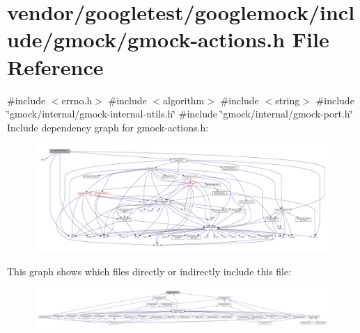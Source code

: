\hypertarget{gmock-actions_8h}{}\section{vendor/googletest/googlemock/include/gmock/gmock-\/actions.h File Reference}
\label{gmock-actions_8h}
{\ttfamily \#include $<$errno.\+h$>$}\newline
{\ttfamily \#include $<$algorithm$>$}\newline
{\ttfamily \#include $<$string$>$}\newline
{\ttfamily \#include \char`\"{}gmock/internal/gmock-\/internal-\/utils.\+h\char`\"{}}\newline
{\ttfamily \#include \char`\"{}gmock/internal/gmock-\/port.\+h\char`\"{}}\newline
Include dependency graph for gmock-\/actions.h\+:
\nopagebreak
\begin{figure}[H]
\begin{center}
\leavevmode
\includegraphics[width=350pt]{gmock-actions_8h__incl}
\end{center}
\end{figure}
This graph shows which files directly or indirectly include this file\+:
\nopagebreak
\begin{figure}[H]
\begin{center}
\leavevmode
\includegraphics[width=350pt]{gmock-actions_8h__dep__incl}
\end{center}
\end{figure}
